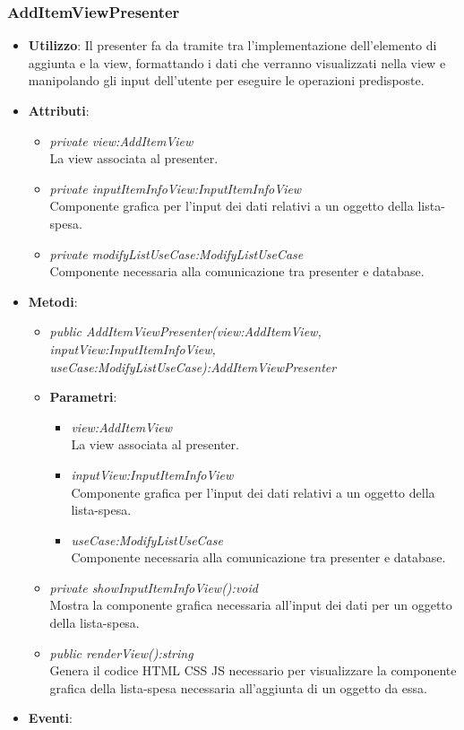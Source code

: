 \subsubsection{AddItemViewPresenter}
\begin{itemize}
item \textbf{Descrizione}: Questa classe rappresenta il presenter per gli elementi di rimozione degli oggetti  della lista-spesa.
\item \textbf{Utilizzo}: Il presenter fa da tramite tra l'implementazione dell'elemento di aggiunta e la view, formattando i dati che verranno visualizzati nella view e manipolando gli input dell'utente per eseguire le operazioni predisposte.
\item \textbf{Attributi}: 
	\begin{itemize}
	\item \textit{private view:AddItemView}\\
	La view associata al presenter.
	\item \textit{private inputItemInfoView:InputItemInfoView}\\
	Componente grafica per l'input dei dati relativi a un oggetto della lista-spesa.
	\item \textit{private modifyListUseCase:ModifyListUseCase}\\
	Componente necessaria alla comunicazione tra presenter e database.
	\end{itemize}
\item \textbf{Metodi}:
	\begin{itemize}
	\item \textit{public AddItemViewPresenter(view:AddItemView, inputView:InputItemInfoView, useCase:ModifyListUseCase):AddItemViewPresenter}	
		\item{\textbf{Parametri}: \begin{itemize}
		\item \textit{view:AddItemView}\\
			La view associata al presenter.
		\item \textit{inputView:InputItemInfoView}\\
			Componente grafica per l'input dei dati relativi a un oggetto della lista-spesa.
		\item \textit{useCase:ModifyListUseCase}\\
			Componente necessaria alla comunicazione tra presenter e database.
		\end{itemize}}
	\item \textit{private showInputItemInfoView():void}\\
	Mostra la componente grafica necessaria all'input dei dati per un oggetto della lista-spesa.
	\item \textit{public renderView():string}\\
	Genera il codice HTML CSS JS necessario per visualizzare la componente grafica della lista-spesa necessaria all'aggiunta di un oggetto da essa.
	\end{itemize}
\item \textbf{Eventi}:
\end{itemize}

